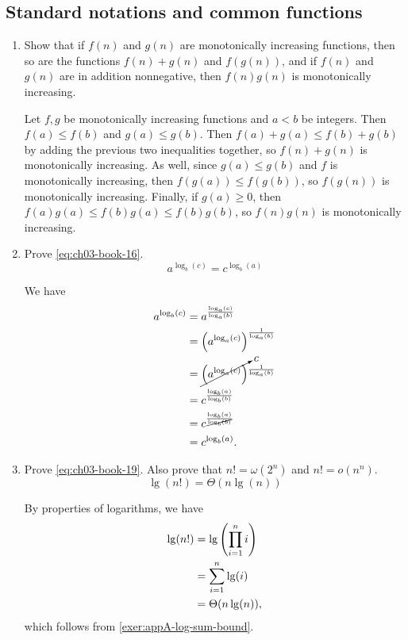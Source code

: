\documentclass[Chapter03]{subfiles}
\begin{document}
	\subsection{Standard notations and common functions}

	\begin{enumerate}
		\item Show that if $f(n)$ and $g(n)$ are monotonically increasing functions, then so are the functions $f(n) + g(n)$ and $f(g(n))$, and if $f(n)$ and $g(n)$ are in addition nonnegative, then $f(n)g(n)$ is monotonically increasing.
		\begin{answer}
			Let $f,g$ be monotonically increasing functions and $a < b$ be integers. Then $f(a) \leq f(b)$ and $g(a) \leq g(b)$. Then $f(a) + g(a) \leq f(b) + g(b)$ by adding the previous two inequalities together, so $f(n) + g(n)$ is monotonically increasing. As well, since $g(a) \leq g(b)$ and $f$ is monotonically increasing, then $f(g(a)) \leq f(g(b))$, so $f(g(n))$ is monotonically increasing. Finally, if $g(a) \geq 0$,  then $f(a)g(a) \leq f(b)g(a) \leq f(b)g(b)$, so $f(n)g(n)$ is monotonically increasing.
		\end{answer}

		\item Prove \cref{eq:ch03-book-16}.
		\begin{equation}
			a^{\log_b(c)} = c^{\log_b(a)} \label{eq:ch03-book-16} \tag{3.16}
		\end{equation}
		\begin{answer}
			We have
			\begin{align*}
				a^{\log_b(c)} &= a^{\frac{\log_a(c)}{\log_a(b)}}\\
					&= \qty(a^{\log_a(c)})^{\frac{1}{\log_a(b)}}\\
					&= \cancelto{c}{\qty(a^{\log_a(c)})}^{\frac{1}{\log_a(b)}}\\
					&= c^{\frac{\log_b(a)}{\log_b(b)}}\\
					&= c^{\frac{\log_b(a)}{\cancel{\log_b(b)}}}\\
					&= c^{\log_b(a)}.
			\end{align*}
		\end{answer}

		\item Prove \cref{eq:ch03-book-19}. Also prove that $n! = \omega(2^n)$ and $n! = o(n^n)$.
		\begin{equation}
			\lg(n!) = \Theta(n \lg(n)) \label{eq:ch03-book-19} \tag{3.19}
		\end{equation}
		\begin{answer}
			By properties of logarithms, we have
			\begin{align*}
				\lg(n!) &= \lg \qty(\prod_{i = 1}^n i)\\
					&= \sum_{i = 1}^n \lg(i)\\
					&= \Theta(n \lg(n)),
			\end{align*}
			which follows from \cref{exer:appA-log-sum-bound}.


\end{answer}
\end{enumerate}
\end{document}
